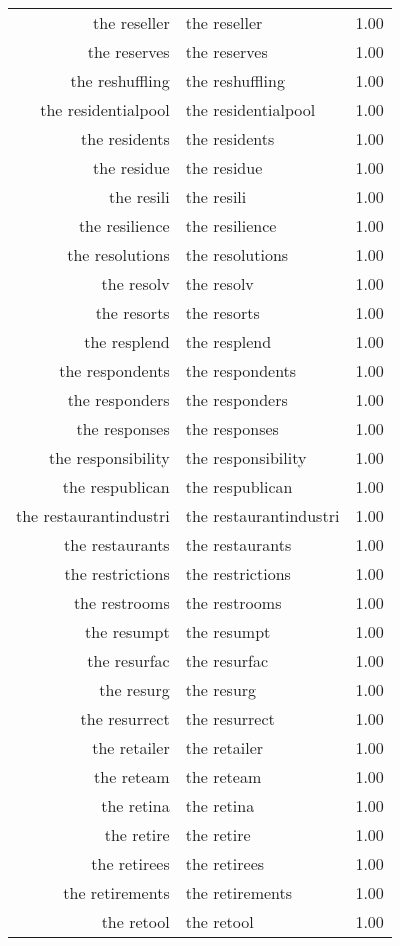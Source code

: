 \begin{table}[ht]
\begin{tabular}{rlr}
  the reseller & the reseller & 1.00 \\ 
  the reserves & the reserves & 1.00 \\ 
  the reshuffling & the reshuffling & 1.00 \\ 
  the residentialpool & the residentialpool & 1.00 \\ 
  the residents & the residents & 1.00 \\ 
  the residue & the residue & 1.00 \\ 
  the resili & the resili & 1.00 \\ 
  the resilience & the resilience & 1.00 \\ 
  the resolutions & the resolutions & 1.00 \\ 
  the resolv & the resolv & 1.00 \\ 
  the resorts & the resorts & 1.00 \\ 
  the resplend & the resplend & 1.00 \\ 
  the respondents & the respondents & 1.00 \\ 
  the responders & the responders & 1.00 \\ 
  the responses & the responses & 1.00 \\ 
  the responsibility & the responsibility & 1.00 \\ 
  the respublican & the respublican & 1.00 \\ 
  the restaurantindustri & the restaurantindustri & 1.00 \\ 
  the restaurants & the restaurants & 1.00 \\ 
  the restrictions & the restrictions & 1.00 \\ 
  the restrooms & the restrooms & 1.00 \\ 
  the resumpt & the resumpt & 1.00 \\ 
  the resurfac & the resurfac & 1.00 \\ 
  the resurg & the resurg & 1.00 \\ 
  the resurrect & the resurrect & 1.00 \\ 
  the retailer & the retailer & 1.00 \\ 
  the reteam & the reteam & 1.00 \\ 
  the retina & the retina & 1.00 \\ 
  the retire & the retire & 1.00 \\ 
  the retirees & the retirees & 1.00 \\ 
  the retirements & the retirements & 1.00 \\ 
  the retool & the retool & 1.00 \\ 

\end{tabular}
\end{table}

